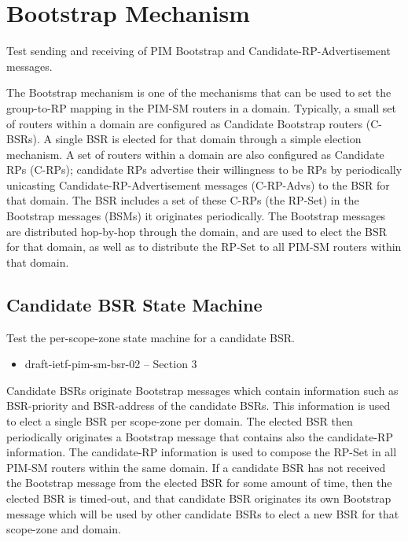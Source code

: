 \documentclass[11pt]{report}
\begin{document}
\chapter{Bootstrap Mechanism}

Test sending and receiving of PIM Bootstrap and Candidate-RP-Advertisement
messages.

The Bootstrap mechanism is one of the mechanisms that can be used
to set the group-to-RP mapping in the PIM-SM routers in a domain.
Typically, a small set of routers within a domain are configured as Candidate
Bootstrap routers (C-BSRs). A single BSR is elected for that domain through a
simple election mechanism. A set of routers within a domain are also
configured as Candidate RPs (C-RPs); candidate RPs advertise their willingness
to be RPs by periodically unicasting Candidate-RP-Advertisement messages
(C-RP-Advs) to the BSR for that domain. The BSR includes a set of these C-RPs
(the RP-Set) in the Bootstrap messages (BSMs) it originates periodically. The
Bootstrap messages are distributed hop-by-hop through the domain, and are used
to elect the BSR for that domain, as well as to distribute the RP-Set to all
PIM-SM routers within that domain.

\newpage
\section{Candidate BSR State Machine}

Test the per-scope-zone state machine for a candidate BSR.

\begin{itemize}
  \item draft-ietf-pim-sm-bsr-02 -- Section 3
\end{itemize}

Candidate BSRs originate Bootstrap messages which contain information such as
BSR-priority and BSR-address of the candidate BSRs.
This information is used
to elect a single BSR per scope-zone per domain. The elected BSR then
periodically originates a Bootstrap message that contains also the
candidate-RP information. The candidate-RP information is used to compose the
RP-Set in all PIM-SM routers within the same domain. If a candidate BSR has
not received the Bootstrap message from the elected BSR for some amount of
time, then the elected BSR is timed-out, and that candidate BSR originates its
own Bootstrap message which will be used by other candidate BSRs to elect a
new BSR for that scope-zone and domain.
\end{document}
